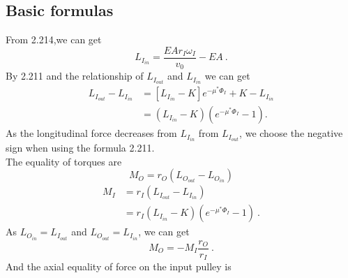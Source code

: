 \documentclass[a4paper,fleqn,13pt]{article}
\begin{document}
\subsection{Basic formulas}
From 2.214,we can get
\begin{equation}  \label{Eq:LIIN}
 L_{I_{in}} = \frac{EA r_I\omega_I}{v_0} - EA \ .
\end{equation}
By 2.211 and the relationship of $L_{I_{out}}$ and $L_{I_{in}}$ we can get
\begin{equation}
  \begin{aligned}
    L_{I_{out}} -L_{I_{in}} &= [L_{I_{in}} -K]e^{-\mu^*\Phi_I} + K -L_{I_{in}} \\
			    &= (L_{I_{in}} -K)(e^{-\mu^*\Phi_I} -1).
  \end{aligned}
\end{equation}
As the longitudinal force decreases from $L_{I_{in}}$ from $L_{I_{out}}$, we choose the negative sign when using the formula 2.211.\\
The equality of torques are
\begin{equation}
 M_O = r_O (L_{O_{out}} -L_{O_{in}})
\end{equation}
\begin{equation}
 \begin{aligned}
   M_I & = r_I (L_{I_{out}} - L_{I_{in}}) \\
       & = r_I (L_{I_{in}} - K)(e^{-\mu^*\Phi_I} -1) \ . 
 \end{aligned}
\end{equation}
As $L_{O_{in}} = L_{I_{out}}$ and $L_{O_{out}} = L_{I_{in}}$, we can get
\begin{equation} \label{Eq:M_O}
 M_O = - M_I \frac{r_O}{r_I} \ .
\end{equation}
And the axial equality of force on the input pulley is
\newcommand{\ud}{\mathrm{d}}
\end{document}
